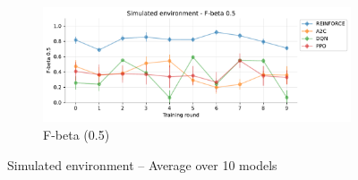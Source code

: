 \documentclass[a4paper, 12pt]{article}
\begin{document}
\begin{figure}[!htbp]
	\begin{subfigure}{\textwidth}
		\centering
		\includegraphics[width=\linewidth]{Simulated_F05.pdf}  
		\caption{F-beta (0.5)}
		\label{fig:tr-sim-f05}
	\end{subfigure}
	\caption{Simulated environment -- Average over 10 models}
	\label{fig:tr-sim-env}
\end{figure}
\end{document}

